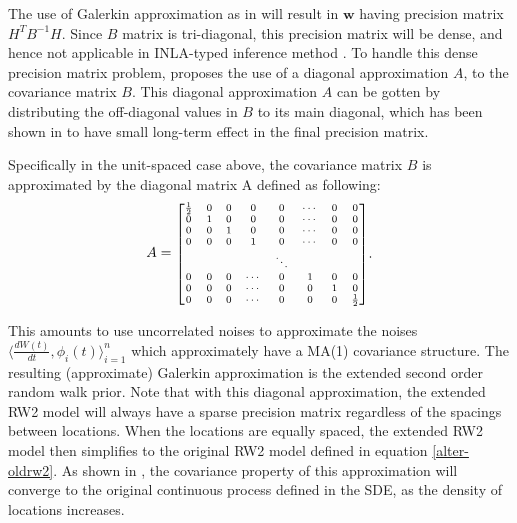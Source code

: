 \documentclass{article}
\begin{document}
The use of Galerkin approximation as in \cite{rw2} will result in $\boldsymbol w$ having precision matrix $H^TB^{-1}H$. Since $B$ matrix is tri-diagonal, this precision matrix will be dense, and hence not applicable in INLA-typed inference method \citep{inla}. To handle this dense precision matrix problem, \cite{rw2} proposes the use of a diagonal approximation $A$, to the covariance matrix $B$. This diagonal approximation $A$ can be gotten by distributing the off-diagonal values in $B$ to its main diagonal, which has been shown in \citep{rw2} to have small long-term effect in the final precision matrix.

Specifically in the unit-spaced case above, the covariance matrix $B$ is approximated by the diagonal matrix A defined as following:
\begin{equation}
\begin{aligned}
A = \mbox{\scriptsize $\begin{bmatrix}
\frac{1}{2} & 0 & 0 & 0 & 0 & \cdots & 0 & 0\\
0 & 1 & 0 & 0 & 0 & \cdots & 0 & 0\\
0 & 0 & 1 & 0 & 0 & \cdots & 0 & 0\\
0 & 0 & 0 & 1 & 0 & \cdots & 0 & 0\\
 &  &  &  & \ddots &  & & \\
 0 & 0 & 0 & \cdots & 0 & 1 & 0 & 0\\
0 & 0 & 0 & \cdots & 0 & 0 & 1 & 0\\
0 & 0 & 0 & \cdots & 0 & 0 & 0 & \frac{1}{2} \\
\end{bmatrix}$}
\end{aligned}.
\end{equation}

This amounts to use uncorrelated noises to approximate the noises $\langle \frac{dW(t)}{dt} , \phi_i(t)\rangle_{i=1}^n$
which approximately have a MA(1) covariance structure. The resulting (approximate) Galerkin approximation is the extended second order random walk prior. Note that with this diagonal approximation, the extended RW2 model will always have a sparse precision matrix regardless of the spacings between locations. When the locations are equally spaced, the extended RW2 model then simplifies to the original RW2 model defined in equation \ref{alter-oldrw2}. As shown in \cite{rw2}, the covariance property of this approximation will converge to the original continuous process defined in the SDE, as the density of locations increases.
\end{document}
